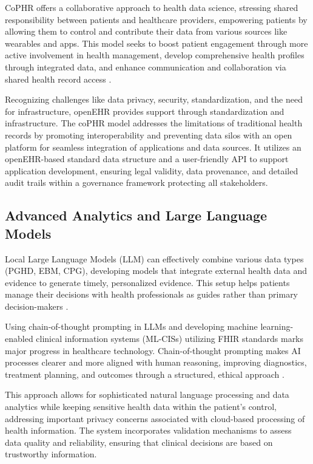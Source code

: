 CoPHR offers a collaborative approach to health data science, stressing shared responsibility between patients and healthcare providers, empowering patients by allowing them to control and contribute their data from various sources like wearables and apps. This model seeks to boost patient engagement through more active involvement in health management, develop comprehensive health profiles through integrated data, and enhance communication and collaboration via shared health record access \cite{apperta2018blueprint}.

Recognizing challenges like data privacy, security, standardization, and the need for infrastructure, openEHR provides support through standardization and infrastructure. The coPHR model addresses the limitations of traditional health records by promoting interoperability and preventing data silos with an open platform for seamless integration of applications and data sources. It utilizes an openEHR-based standard data structure and a user-friendly API to support application development, ensuring legal validity, data provenance, and detailed audit trails within a governance framework protecting all stakeholders.

\subsection{Advanced Analytics and Large Language Models}

Local Large Language Models (LLM) can effectively combine various data types (PGHD, EBM, CPG), developing models that integrate external health data and evidence to generate timely, personalized evidence. This setup helps patients manage their decisions with health professionals as guides rather than primary decision-makers \cite{miao2024chain}.

Using chain-of-thought prompting in LLMs and developing machine learning-enabled clinical information systems (ML-CISs) utilizing FHIR standards marks major progress in healthcare technology. Chain-of-thought prompting makes AI processes clearer and more aligned with human reasoning, improving diagnostics, treatment planning, and outcomes through a structured, ethical approach \cite{balch2023machine}.

This approach allows for sophisticated natural language processing and data analytics while keeping sensitive health data within the patient's control, addressing important privacy concerns associated with cloud-based processing of health information. The system incorporates validation mechanisms to assess data quality and reliability, ensuring that clinical decisions are based on trustworthy information.

